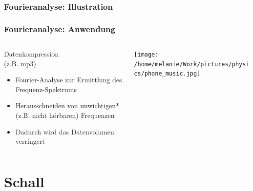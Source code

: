 \documentclass{beamer}
\begin{document}
\begin{frame}
\frametitle{Fourieranalyse: Illustration}

\centering
{}

\end{frame}

\begin{frame}
\frametitle{Fourieranalyse: Anwendung}

\begin{columns}[c]

\begin{column}{5cm}
\begin{block}{Datenkompression\\ (z.B. mp3)}

\begin{itemize}
\item
Fourier-Analyse zur Ermittlung des Frequenz-Spektrums
\item
Herausschneiden von unwichtigen* (z.B. nicht hörbaren) Frequenzen
\item
Dadurch wird das Datenvolumen verringert
\end{itemize}

\end{block}

\end{column}


\begin{column}{5cm}

\begin{center}
\texttt{[image: /home/melanie/Work/pictures/physics/phone\_music.jpg]}
\end{center}

\end{column}

\end{columns}


\end{frame}





\section{Schall}

\begin{frame}
\end{frame}
\end{document}
